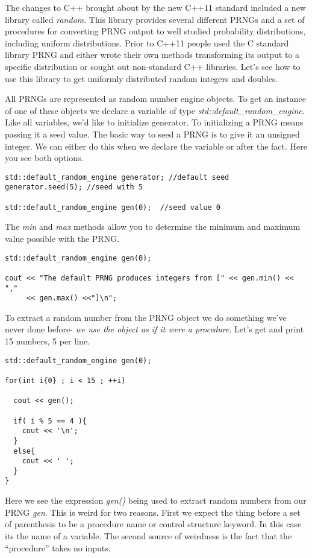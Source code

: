 \documentclass[]{tufte-handout}
\begin{document}
The changes to C++ brought about by the new C++11 standard included a new library called \textit{random}. This library provides several different PRNGs and a set of procedures for converting PRNG output to well studied probability distributions, including uniform distributions. Prior to C++11 people used the C standard library PRNG and either wrote their own methods transforming its output to a specific distribution or sought out non-standard C++ libraries. Let's see how to use this library to get uniformly distributed random integers and doubles.    

All PRNGs are represented as random number engine objects. To get an instance of one of these objects we declare a variable of type \textit{std::default\_random\_engine}. Like all variables, we'd like to initialize generator. To initializing a PRNG means passing it a seed value. The basic way to seed a PRNG is to give it an unsigned integer. We can either do this when we declare the variable or after the fact.  Here you see both options.

\begin{verbatim}
std::default_random_engine generator; //default seed
generator.seed(5); //seed with 5

std::default_random_engine gen(0);  //seed value 0 
\end{verbatim}

The \textit{min} and \textit{max} methods allow you to determine the minimum and maximum value possible with the PRNG.
\begin{verbatim}
std::default_random_engine gen(0);  

cout << "The default PRNG produces integers from [" << gen.min() << "," 
     << gen.max() <<"]\n";
\end{verbatim}

To extract a random number from the PRNG object we do something we've never done before- \textit{we use the object as if it were a procedure}. Let's get and print 15 numbers, 5 per line.
\begin{verbatim}
std::default_random_engine gen(0);  

for(int i{0} ; i < 15 ; ++i)

  cout << gen();
  
  if( i % 5 == 4 ){
    cout << '\n';
  } 
  else{
    cout << ' ';
  }
}
\end{verbatim}
Here we see the expression \textit{gen()} being used to extract random numbers from our PRNG \textit{gen}. This is weird for two reasons. First we expect the thing before a set of parenthesis to be a procedure name or control structure keyword. In this case its the name of a variable. The second source of weirdness is the fact that the ``procedure'' takes no inputs.
\end{document}
